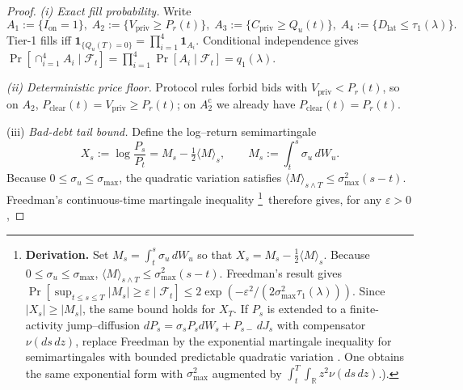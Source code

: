 \documentclass[11pt]{article}
\begin{document}
\begin{proof}
\emph{(i) Exact fill probability.}
Write
\(
  A_1:=\{I_{\mathrm{on}}=1\},\;
  A_2:=\{V_{\mathrm{priv}}\ge P_r(t)\},\;
  A_3:=\{C_{\mathrm{priv}}\ge Q_u(t)\},\;
  A_4:=\{D_{\mathrm{lat}}\le\tau_1(\lambda)\}.
\)
Tier-1 fills iff
\(
  \mathbf 1_{\{Q_u(T)=0\}}=\prod_{i=1}^4\mathbf 1_{A_i}.
\)
Conditional independence gives
\(
  \Pr[\cap_{i=1}^4A_i\mid\mathcal F_t]
     =\prod_{i=1}^4\Pr[A_i\mid\mathcal F_t]
     =q_1(\lambda).
\)

\smallskip
\noindent
\emph{(ii) Deterministic price floor.}
Protocol rules forbid bids with
$V_{\mathrm{priv}}<P_r(t)$, so on $A_2$,
$P_{\mathrm{clear}}(t)=V_{\mathrm{priv}}\ge P_r(t)$; on $A_2^{\mathrm c}$
we already have $P_{\mathrm{clear}}(t)=P_r(t)$.

\smallskip
\noindent

\item[(iii)]  \emph{Bad-debt tail bound.}
      Define the log–return semimartingale
      \[
         X_s:=\log\frac{P_s}{P_t}
              =M_s-\tfrac12\langle M\rangle_s,
         \qquad
         M_s:=\int_t^s\sigma_u\,dW_u.
      \]
      Because \(0\le\sigma_u\le\sigma_{\max}\),
      the quadratic variation satisfies
      \(\langle M\rangle_{s\wedge T}
          \le\sigma_{\max}^2(s-t)\).
      Freedman’s continuous-time martingale inequality%
\footnote{%
\textbf{Derivation.}  Set
\(M_s=\int_t^s\sigma_u\,dW_u\)
so that
\(X_s=M_s-\frac12\langle M\rangle_s\).
Because \(0\!\le\!\sigma_u\!\le\!\sigma_{\max}\),
\(\langle M\rangle_{s\wedge T}\le\sigma_{\max}^2(s-t)\).
Freedman’s result \parencite[Th.\,2]{freedman1975tail}
gives
\(
  \Pr[\sup_{t\le s\le T}|M_s|\ge\varepsilon\mid\mathcal F_t]
  \le 2\exp(-\varepsilon^{2}/(2\sigma_{\max}^{2}\tau_1(\lambda))).
\)
Since \(|X_s|\ge|M_s|\), the same bound holds for \(X_T\).
If \(P_s\) is extended to a finite-activity
      jump–diffusion
      \(dP_s=\sigma_s P_s dW_s+P_{s-}\,dJ_s\)
      with compensator
      \(\nu(ds\,dz)\),
      replace Freedman by the exponential martingale inequality for
      semimartingales with bounded predictable quadratic variation
      \parencite[Th.\,8.7]{applebaum2009}.  One obtains the same
      exponential form with
      \(\sigma_{\max}^2\) augmented by
      \(\int_{t}^{T}\!\!\int_{\mathbb R}z^2\nu(ds\,dz)\).).
}\,
therefore gives, for any \(\varepsilon>0\),


\end{proof}
\end{document}
